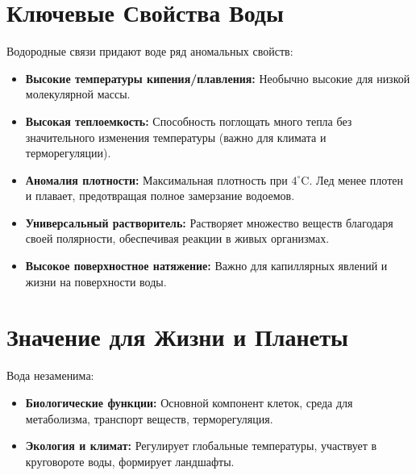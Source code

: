\documentclass{article}
\begin{document}
\begin{preview}
\begin{center}
\end{center}

\end{preview}\newpage\begin{preview}

\section{Ключевые Свойства Воды}
Водородные связи придают воде ряд аномальных свойств:
\begin{itemize}
    \item \textbf{Высокие температуры кипения/плавления:} Необычно высокие для низкой молекулярной массы.
    \item \textbf{Высокая теплоемкость:} Способность поглощать много тепла без значительного изменения температуры (важно для климата и терморегуляции).
    \item \textbf{Аномалия плотности:} Максимальная плотность при $4^\circ\text{C}$. Лед менее плотен и плавает, предотвращая полное замерзание водоемов.
    \item \textbf{Универсальный растворитель:} Растворяет множество веществ благодаря своей полярности, обеспечивая реакции в живых организмах.
    \item \textbf{Высокое поверхностное натяжение:} Важно для капиллярных явлений и жизни на поверхности воды.
\end{itemize}

\section{Значение для Жизни и Планеты}
Вода незаменима:
\begin{itemize}
    \item \textbf{Биологические функции:} Основной компонент клеток, среда для метаболизма, транспорт веществ, терморегуляция.
    \item \textbf{Экология и климат:} Регулирует глобальные температуры, участвует в круговороте воды, формирует ландшафты.
\end{itemize}


\end{preview}
\end{document}
